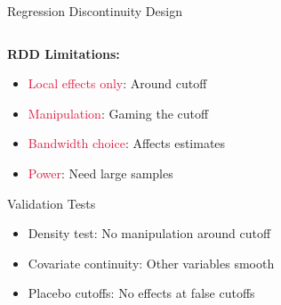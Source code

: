 \documentclass[aspectratio=169,11pt]{beamer}
\begin{document}
\begin{frame}[fragile]{Regression Discontinuity Design}
\begin{columns}
\begin{column}{0.45\textwidth}
\vspace{0.3cm}
\textbf{RDD Limitations:}
\begin{itemize}
\item \textcolor{crimson}{Local effects only}: Around cutoff
\item \textcolor{crimson}{Manipulation}: Gaming the cutoff
\item \textcolor{crimson}{Bandwidth choice}: Affects estimates
\item \textcolor{crimson}{Power}: Need large samples
\end{itemize}

\begin{alertblock}{Validation Tests}
\begin{itemize}
\item Density test: No manipulation around cutoff
\item Covariate continuity: Other variables smooth
\item Placebo cutoffs: No effects at false cutoffs
\end{itemize}
\end{alertblock}
\end{column}
\end{columns}
\end{frame}
\end{document}
